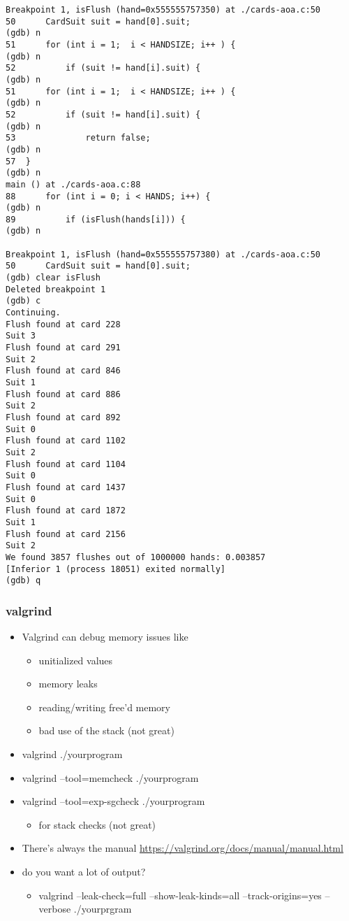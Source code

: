 \documentclass[11pt]{article}
\begin{document}
\begin{verbatim}
Breakpoint 1, isFlush (hand=0x555555757350) at ./cards-aoa.c:50
50	    CardSuit suit = hand[0].suit;
(gdb) n
51	    for (int i = 1;  i < HANDSIZE; i++ ) {
(gdb) n
52	        if (suit != hand[i].suit) {
(gdb) n
51	    for (int i = 1;  i < HANDSIZE; i++ ) {
(gdb) n
52	        if (suit != hand[i].suit) {
(gdb) n
53	            return false;
(gdb) n
57	}
(gdb) n
main () at ./cards-aoa.c:88
88	    for (int i = 0; i < HANDS; i++) {
(gdb) n
89	        if (isFlush(hands[i])) {
(gdb) n

Breakpoint 1, isFlush (hand=0x555555757380) at ./cards-aoa.c:50
50	    CardSuit suit = hand[0].suit;
(gdb) clear isFlush
Deleted breakpoint 1 
(gdb) c
Continuing.
Flush found at card 228
Suit 3
Flush found at card 291
Suit 2
Flush found at card 846
Suit 1
Flush found at card 886
Suit 2
Flush found at card 892
Suit 0
Flush found at card 1102
Suit 2
Flush found at card 1104
Suit 0
Flush found at card 1437
Suit 0
Flush found at card 1872
Suit 1
Flush found at card 2156
Suit 2
We found 3857 flushes out of 1000000 hands: 0.003857
[Inferior 1 (process 18051) exited normally]
(gdb) q
\end{verbatim}

\subsubsection{valgrind}
\label{sec:org56b9302}

\begin{itemize}
\item Valgrind can debug memory issues like
\begin{itemize}
\item unitialized values
\item memory leaks
\item reading/writing free'd memory
\item bad use of the stack (not great)
\end{itemize}

\item valgrind ./yourprogram
\item valgrind --tool=memcheck ./yourprogram
\item valgrind --tool=exp-sgcheck ./yourprogram
\begin{itemize}
\item for stack checks (not great)
\end{itemize}
\item There's always the manual \url{https://valgrind.org/docs/manual/manual.html}
\item do you want a lot of output?
\begin{itemize}
\item valgrind --leak-check=full --show-leak-kinds=all --track-origins=yes  --verbose ./yourprgram
\end{itemize}
\end{itemize}
\end{document}
